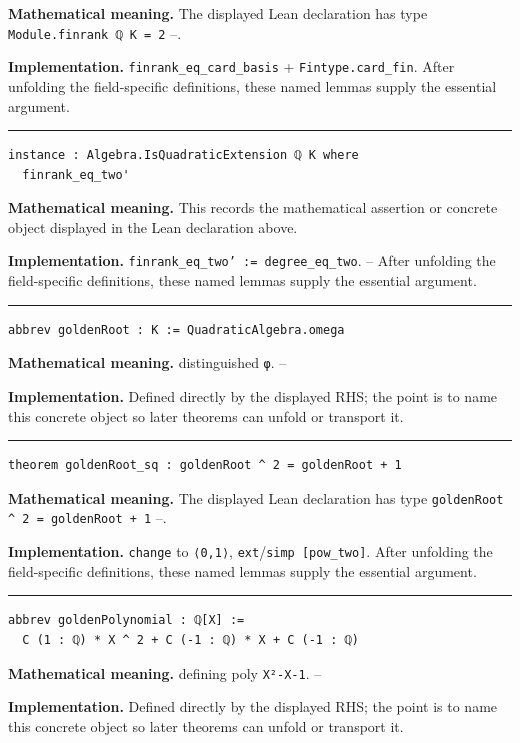 \documentclass[UTF8,a4paper,11pt,fontset=fandol]{ctexart}
\theoremstyle{definition}
\newcommand{\statementsep}{\par\medskip\hrule\medskip}
\begin{document}
\noindent\textbf{Mathematical meaning.} The displayed Lean declaration has type \texttt{Module.\allowbreak{}finrank ℚ K = 2} --.\par
\noindent\textbf{Implementation.} \texttt{finrank\_\allowbreak{}eq\_\allowbreak{}card\_\allowbreak{}basis} + \texttt{Fintype.\allowbreak{}card\_\allowbreak{}fin}. After unfolding the field-specific definitions, these named lemmas supply the essential argument.\par
\statementsep
\begin{verbatim}
instance : Algebra.IsQuadraticExtension ℚ K where
  finrank_eq_two'
\end{verbatim}
\noindent\textbf{Mathematical meaning.} This records the mathematical assertion or concrete object displayed in the Lean declaration above.\par
\noindent\textbf{Implementation.} \texttt{finrank\_\allowbreak{}eq\_\allowbreak{}two' := degree\_\allowbreak{}eq\_\allowbreak{}two}. -- After unfolding the field-specific definitions, these named lemmas supply the essential argument.\par
\statementsep
\begin{verbatim}
abbrev goldenRoot : K := QuadraticAlgebra.omega
\end{verbatim}
\noindent\textbf{Mathematical meaning.} distinguished \texttt{φ}. --\par
\noindent\textbf{Implementation.} Defined directly by the displayed RHS; the point is to name this concrete object so later theorems can unfold or transport it.\par
\statementsep
\begin{verbatim}
theorem goldenRoot_sq : goldenRoot ^ 2 = goldenRoot + 1
\end{verbatim}
\noindent\textbf{Mathematical meaning.} The displayed Lean declaration has type \texttt{goldenRoot \textasciicircum{} 2 = goldenRoot + 1} --.\par
\noindent\textbf{Implementation.} \texttt{change} to \texttt{⟨0,1⟩}, \texttt{ext}/\texttt{simp [pow\_\allowbreak{}two]}. After unfolding the field-specific definitions, these named lemmas supply the essential argument.\par
\statementsep
\begin{verbatim}
abbrev goldenPolynomial : ℚ[X] :=
  C (1 : ℚ) * X ^ 2 + C (-1 : ℚ) * X + C (-1 : ℚ)
\end{verbatim}
\noindent\textbf{Mathematical meaning.} defining poly \texttt{X²-X-1}. --\par
\noindent\textbf{Implementation.} Defined directly by the displayed RHS; the point is to name this concrete object so later theorems can unfold or transport it.\par
\end{document}
